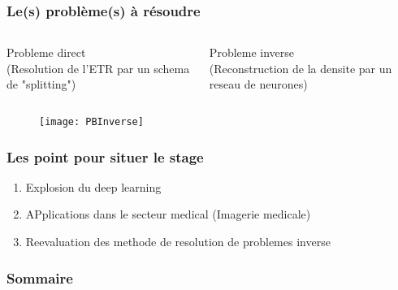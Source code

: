 \begin{frame}
  \frametitle{Le(s) problème(s) à résoudre}

\begin{columns}
 \begin{column}{0.5\textwidth}
  \centering
    Probleme direct \\ (\scriptsize Resolution de l'ETR par un schema de "splitting")
  \end{column}
 \pause
 \begin{column}{0.5\textwidth}
    \centering
    Probleme inverse \\ (\scriptsize Reconstruction de la densite par un reseau de neurones)
 \end{column}
\end{columns}

\begin{figure}
  \texttt{[image: PBInverse]}         
\end{figure}

\end{frame}
\begin{frame}
  \frametitle{Les point pour situer le stage}

  \begin{enumerate}
    \item Explosion du deep learning %
    \item APplications dans le secteur medical (Imagerie medicale) %
    \item Reevaluation des methode de resolution de problemes inverse %
  \end{enumerate}
  
\end{frame}

\begin{frame}
  \scriptsize
  \frametitle{Sommaire}
  \tableofcontents
\end{frame}


% 
